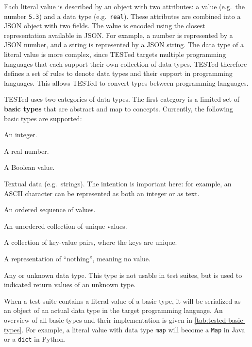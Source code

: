 \documentclass[../main]{subfiles}
\begin{document}
Each literal value is described by an object with two attributes: a value (e.g.\ the number \texttt{5.3}) and a data type (e.g.\ \texttt{real}).
These attributes are combined into a JSON object with two fields.
The value is encoded using the closest representation available in JSON\@.
For example, a number is represented by a JSON number, and a string is represented by a JSON string.
The data type of a literal value is more complex, since TESTed targets multiple programming languages that each support their own collection of data types.
TESTed therefore defines a set of rules to denote data types and their support in programming languages.
This allows TESTed to convert types between programming languages.

TESTed uses two categories of data types.
The first category is a limited set of \textbf{basic types} that are abstract and map to concepts.
Currently, the following basic types are supported:

\begin{description}[noitemsep]
    \item[\texttt{integer}] An integer.
    \item[\texttt{real}] A real number.
    \item[\texttt{boolean}] A Boolean value.
    \item[\texttt{text}] Textual data (e.g.\ strings).
          The intention is important here: for example, an \textsc{ASCII} character can be represented as both an integer or as text.
    \item[\texttt{sequence}] An ordered sequence of values.
    \item[\texttt{set}] An unordered collection of unique values.
    \item[\texttt{map}] A collection of key-value pairs, where the keys are unique.
    \item[\texttt{nothing}] A representation of ``nothing'', meaning no value.
    \item[\texttt{any}]  Any or unknown data type. This type is not usable in test suites, but is used to indicated return values of an unknown type.
\end{description}

When a test suite contains a literal value of a basic type, it will be serialized as an object of an actual data type in the target programming language.
An overview of all basic types and their implementation is given in \cref{tab:tested-basic-types}.
For example, a literal value with data type \texttt{map} will become a \texttt{Map} in Java or a \texttt{dict} in Python.
\end{document}
